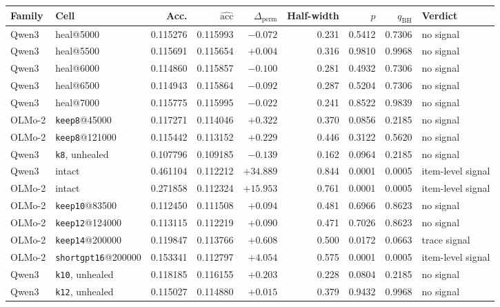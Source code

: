 \begin{table}[t]
\centering
\scriptsize
\setlength{\tabcolsep}{3.2pt}
\begin{tabular}{llrrrrrrl}
\toprule
Family & Cell & Acc. & $\widehat{\mathrm{acc}}$ & $\Delta_{\mathrm{perm}}$ & Half-width & $p$ & $q_{\mathrm{BH}}$ & Verdict \\
\midrule
Qwen3 & heal@5000 & 0.115276 & 0.115993 & $-0.072$ & 0.231 & 0.5412 & 0.7306 & no signal \\
Qwen3 & heal@5500 & 0.115691 & 0.115654 & $+0.004$ & 0.316 & 0.9810 & 0.9968 & no signal \\
Qwen3 & heal@6000 & 0.114860 & 0.115857 & $-0.100$ & 0.281 & 0.4932 & 0.7306 & no signal \\
Qwen3 & heal@6500 & 0.114943 & 0.115864 & $-0.092$ & 0.287 & 0.5204 & 0.7306 & no signal \\
Qwen3 & heal@7000 & 0.115775 & 0.115995 & $-0.022$ & 0.241 & 0.8522 & 0.9839 & no signal \\
OLMo-2 & \texttt{keep8}@45000 & 0.117271 & 0.114046 & $+0.322$ & 0.370 & 0.0856 & 0.2185 & no signal \\
OLMo-2 & \texttt{keep8}@121000 & 0.115442 & 0.113152 & $+0.229$ & 0.446 & 0.3122 & 0.5620 & no signal \\
Qwen3 & \texttt{k8}, unhealed & 0.107796 & 0.109185 & $-0.139$ & 0.162 & 0.0964 & 0.2185 & no signal \\
Qwen3 & intact & 0.461104 & 0.112212 & $+34.889$ & 0.844 & 0.0001 & 0.0005 & item-level signal \\
OLMo-2 & intact & 0.271858 & 0.112324 & $+15.953$ & 0.761 & 0.0001 & 0.0005 & item-level signal \\
OLMo-2 & \texttt{keep10}@83500 & 0.112450 & 0.111508 & $+0.094$ & 0.481 & 0.6966 & 0.8623 & no signal \\
OLMo-2 & \texttt{keep12}@124000 & 0.113115 & 0.112219 & $+0.090$ & 0.471 & 0.7026 & 0.8623 & no signal \\
OLMo-2 & \texttt{keep14}@200000 & 0.119847 & 0.113766 & $+0.608$ & 0.500 & 0.0172 & 0.0663 & trace signal \\
OLMo-2 & \texttt{shortgpt16}@200000 & 0.153341 & 0.112797 & $+4.054$ & 0.575 & 0.0001 & 0.0005 & item-level signal \\
Qwen3 & \texttt{k10}, unhealed & 0.118185 & 0.116155 & $+0.203$ & 0.228 & 0.0804 & 0.2185 & no signal \\
Qwen3 & \texttt{k12}, unhealed & 0.115027 & 0.114880 & $+0.015$ & 0.379 & 0.9432 & 0.9968 & no signal \\

\end{tabular}
\end{table}
